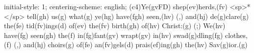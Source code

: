 initial-style: 1;
centering-scheme: english;
(c4)Ye(gvFD) shep(ev)herds,(fv) <sp>*</sp> tell(gh) us(g) what(g) ye(hg) have(fgh) seen,(hv) (,) and(hj) de(g)clare(g) the(fe) tid(fv)ings(d) of(ev) the(fv) birth(gh) of(hv) Christ:(g) (;) We(hv) have(fg) seen(gh) the(f) in(fg)fant(gv) wrapt(gv) in(hv) swad(g)dling(fg) clothes,(f) (,) and(hj) choirs(g) of(fe) an(fv)gels(d) prais(ef)ing(gh) the(hv) Sav(g)ior.(g)
